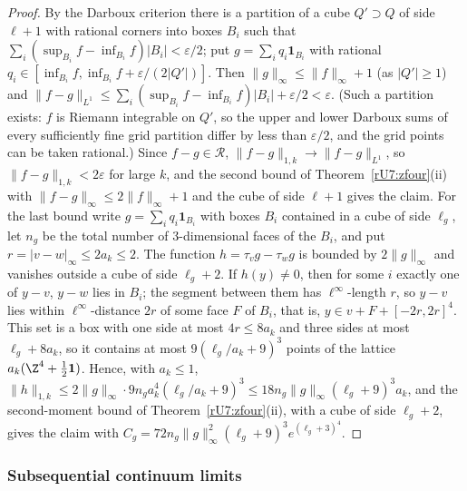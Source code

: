 \begin{proof}
By the Darboux criterion there is a partition of a cube $Q'\supset Q$ of side
$\ell+1$ with rational corners into boxes $B_i$ such that $\sum_i(\sup_{B_i}f
-\inf_{B_i}f)|B_i|<\varepsilon/2$; put $g=\sum_iq_i\mathbf 1_{B_i}$ with
rational $q_i\in[\inf_{B_i}f,\inf_{B_i}f+\varepsilon/(2|Q'|)]$. Then
$\|g\|_\infty\le\|f\|_\infty+1$ (as $|Q'|\ge1$) and $\|f-g\|_{L^1}\le\sum_i
(\sup_{B_i}f-\inf_{B_i}f)|B_i|+\varepsilon/2<\varepsilon$. (Such a partition
exists: $f$ is Riemann integrable on $Q'$, so the upper and lower Darboux sums
of every sufficiently fine grid partition differ by less than $\varepsilon/2$,
and the grid points can be taken rational.) Since $f-g\in\mathcal R$,
$\|f-g\|_{1,k}\to\|f-g\|_{L^1}$, so $\|f-g\|_{1,k}<2\varepsilon$ for large
$k$, and the second bound of Theorem~\ref{rU7:zfour}(ii) with
$\|f-g\|_\infty\le2\|f\|_\infty+1$ and the cube of side $\ell+1$ gives the
claim. For the last bound write $g=\sum_iq_i\mathbf 1_{B_i}$ with boxes $B_i$
contained in a cube of side $\ell_g$, let $n_g$ be the total number of
$3$-dimensional faces of the $B_i$, and put $r=|v-w|_\infty\le2a_k\le2$.
The function $h=\tau_vg-\tau_wg$ is bounded by $2\|g\|_\infty$ and vanishes
outside a cube of side $\ell_g+2$. If $h(y)\ne0$, then for some $i$ exactly
one of $y-v$, $y-w$ lies in $B_i$; the segment between them has
$\ell^\infty$-length $r$, so $y-v$ lies within $\ell^\infty$-distance $2r$
of some face $F$ of $B_i$, that is, $y\in v+F+[-2r,2r]^4$. This set is a
box with one side at most $4r\le8a_k$ and three sides at most $\ell_g+8a_k$,
so it contains at most $9(\ell_g/a_k+9)^3$ points of the lattice
$a_k(\Z^4+\frac12\mathbf 1)$. Hence, with $a_k\le1$,
$\|h\|_{1,k}\le2\|g\|_\infty\cdot9n_ga_k^4(\ell_g/a_k+9)^3\le18n_g\|g\|_\infty
(\ell_g+9)^3a_k$, and the second-moment bound of
Theorem~\ref{rU7:zfour}(ii), with a cube of side $\ell_g+2$, gives the claim
with $C_g=72n_g\|g\|_\infty^2(\ell_g+9)^3e^{(\ell_g+3)^4}$.
\end{proof}
\subsubsection{Subsequential continuum limits}\label{rU7:limits}

